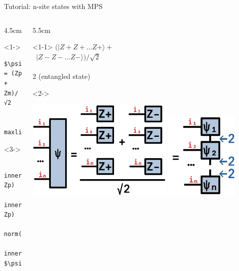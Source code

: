 \begin{frame}[fragile]{Tutorial: n-site states with MPS}

\begin{columns}

\begin{column}{4.5cm}

\begin{onlyenv}<1->
\begin{lstlisting}[language=JuliaLocal, style=julia, mathescape, basicstyle=\small]
$\psi$ = (Zp + Zm)/√2


maxlinkdim($\psi$)
\end{lstlisting}
\end{onlyenv}

\begin{onlyenv}<3->
~\\
\begin{lstlisting}[language=JuliaLocal, style=julia, mathescape, basicstyle=\small]
  inner(Zp, Zp)
  inner(Zm, Zp)
  norm($\psi$)
  inner(Zp, $\psi$)
\end{lstlisting}
\end{onlyenv}

\end{column}

\begin{column}{5.5cm}

\begin{onlyenv}<1-1>
$(|Z+Z+\dots Z+\rangle +$ \\
\  $|Z-Z-\dots Z-\rangle)/\sqrt{2}$ \\
~\\
2 (entangled state)
\end{onlyenv}

\begin{onlyenv}<2->
\begin{center}
\includegraphics[width=0.6\textwidth]{
  slides/assets/catn.png
}
\includegraphics[width=0.3\textwidth]{
  slides/assets/catn_mps.png
}
\end{center}
\end{onlyenv}


\end{column}
\end{columns}
\end{frame}
